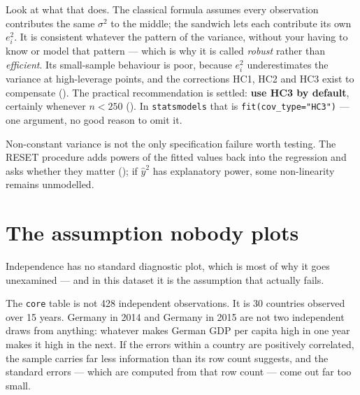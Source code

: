 \documentclass[
  letterpaper,
  10pt,
  twoside,
  openright,
  numbers=noenddot,
  chapterprefix=true]{scrbook}
\begin{document}
Look at what that does. The classical formula assumes every observation
contributes the same \(\sigma^2\) to the middle; the sandwich lets each
contribute its own \(e_i^2\). It is consistent whatever the pattern of
the variance, without your having to know or model that pattern ---
which is why it is called \emph{robust} rather than \emph{efficient}.
Its small-sample behaviour is poor, because \(e_i^2\) underestimates the
variance at high-leverage points, and the corrections HC1, HC2 and HC3
exist to compensate (). The practical recommendation is settled: \textbf{use HC3 by
default}, certainly whenever \(n < 250\) (). In \texttt{statsmodels} that is
\texttt{fit(cov\_type="HC3")} --- one argument, no good reason to omit
it.

Non-constant variance is not the only specification failure worth
testing. The RESET procedure adds powers of the fitted values back into
the regression and asks whether they matter
(); if \(\hat y^2\) has
explanatory power, some non-linearity remains unmodelled.

\section{The assumption nobody plots}\label{the-assumption-nobody-plots}

Independence has no standard diagnostic plot, which is most of why it
goes unexamined --- and in this dataset it is the assumption that
actually fails.

The \texttt{core} table is not 428 independent observations. It is 30
countries observed over 15 years. Germany in 2014 and Germany in 2015
are not two independent draws from anything: whatever makes German GDP
per capita high in one year makes it high in the next. If the errors
within a country are positively correlated, the sample carries far less
information than its row count suggests, and the standard errors ---
which are computed from that row count --- come out far too small.
\end{document}
